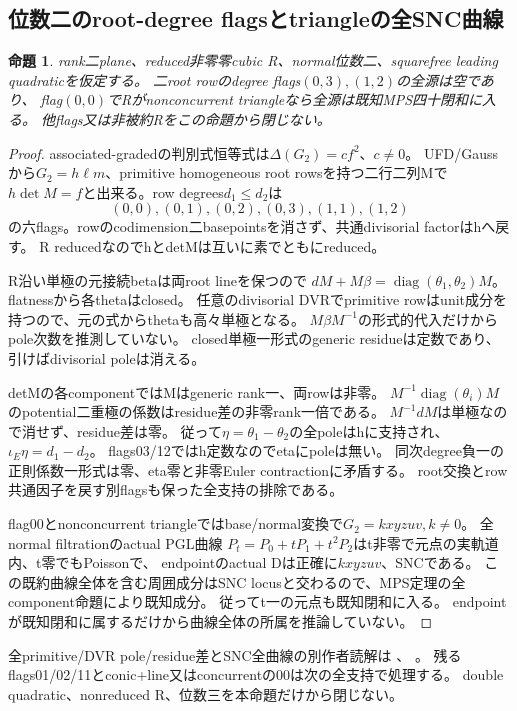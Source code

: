 \documentclass[a4paper,11pt]{ltjsarticle}
\newtheorem{proposition}{命題}[section]
\theoremstyle{definition}
\begin{document}
\subsection{位数二のroot-degree flagsとtriangleの全SNC曲線}
\begin{proposition}\label{prop:plane-m2-rootflags-partial}
rank二plane、reduced非零零cubic R、normal位数二、squarefree leading quadraticを仮定する。
二root rowのdegree flags$(0,3),(1,2)$の全源は空であり、
flag$(0,0)$でRがnonconcurrent triangleなら全源は既知MPS四十閉和に入る。
他flags又は非被約Rをこの命題から閉じない。
\end{proposition}
\begin{proof}
associated-gradedの判別式恒等式は$\Delta(G_2)=cf^2$、$c\ne0$。
UFD/Gaussから$G_2=h\ell m$、primitive homogeneous root rowsを持つ二行二列Mで
$h\det M=f$と出来る。row degrees$d_1\le d_2$は
\[
 (0,0),(0,1),(0,2),(0,3),(1,1),(1,2)
\]
の六flags。rowのcodimension二basepointsを消さず、共通divisorial factorはhへ戻す。
R reducedなのでhとdetMは互いに素でともにreduced。

R沿い単極の元接続betaは両root lineを保つので
$dM+M\beta=\operatorname{diag}(\theta_1,\theta_2)M$。
flatnessから各thetaはclosed。
任意のdivisorial DVRでprimitive rowはunit成分を持つので、元の式からthetaも高々単極となる。
$M\beta M^{-1}$の形式的代入だけからpole次数を推測していない。
closed単極一形式のgeneric residueは定数であり、引けばdivisorial poleは消える。

detMの各componentではMはgeneric rank一、両rowは非零。
$M^{-1}\operatorname{diag}(\theta_i)M$のpotential二重極の係数はresidue差の非零rank一倍である。
$M^{-1}dM$は単極なので消せず、residue差は零。
従って$\eta=\theta_1-\theta_2$の全poleはhに支持され、$\iota_E\eta=d_1-d_2$。
flags03/12ではh定数なのでetaにpoleは無い。
同次degree負一の正則係数一形式は零、eta零と非零Euler contractionに矛盾する。
root交換とrow共通因子を戻す別flagsも保った全支持の排除である。

flag00とnonconcurrent triangleではbase/normal変換で$G_2=kxyzuv,k\ne0$。
全normal filtrationのactual PGL曲線
$P_t=P_0+tP_1+t^2P_2$はt非零で元点の実軌道内、t零でもPoissonで、
endpointのactual Dは正確に$kxyzuv$、SNCである。
この既約曲線全体を含む周囲成分はSNC locusと交わるので、MPS定理の全component命題により既知成分。
従ってt一の元点も既知閉和に入る。
endpointが既知閉和に属するだけから曲線全体の所属を推論していない。
\end{proof}
全primitive/DVR pole/residue差とSNC全曲線の別作者読解は
、
。
残るflags01/02/11とconic+line又はconcurrentの00は次の全支持で処理する。
double quadratic、nonreduced R、位数三を本命題だけから閉じない。
\end{document}
